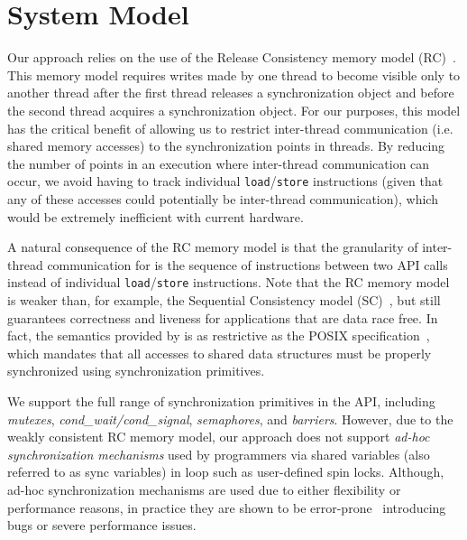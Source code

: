 \section{System Model}
\label{sec:model}

 Our approach relies on the use of the
Release Consistency memory model (RC)~\cite{DSM-RC}. This memory model
requires writes made by one thread to become visible only to another thread after the
first thread releases a synchronization object and before the second thread
acquires a synchronization object. For our purposes, this model has the critical
benefit of allowing us to restrict inter-thread communication (i.e. shared
memory accesses) to the synchronization points in threads. By reducing the number of
points in an execution where inter-thread communication can occur, we avoid
having to track individual {\tt load}/{\tt store} instructions (given that any of these
accesses could potentially be inter-thread communication), which would
be extremely inefficient with current hardware.

A natural consequence of the RC memory model is that the granularity of inter-thread communication  for \projecttitle is the sequence of instructions between two \pthreads API calls instead of  individual {\tt load}/{\tt store} instructions. Note that the RC memory model is weaker
than, for example, the Sequential Consistency model (SC)~\cite{scLamport}, but
still guarantees correctness and liveness for applications that are data race
free. In fact,  the semantics provided by
\projecttitle is as restrictive as the POSIX specification~\cite{pthreads-spec}, which mandates that all accesses to shared data structures must be properly synchronized using
\pthreads synchronization primitives.

 We support the full range of synchronization
primitives in the \pthreads API, including {\em mutexes}, {\em cond\_wait/cond\_signal}, {\em semaphores},  and {\em
barriers}. However, due to the weakly consistent RC memory model, our approach
does not support {\em ad-hoc synchronization mechanisms} used by programmers via
shared variables (also referred to as sync variables) in loop such as user-defined spin locks.
Although, ad-hoc synchronization mechanisms are used due to either flexibility
or performance reasons, in practice they are shown to be
error-prone~\cite{adhoc-sync} introducing bugs or severe performance issues.